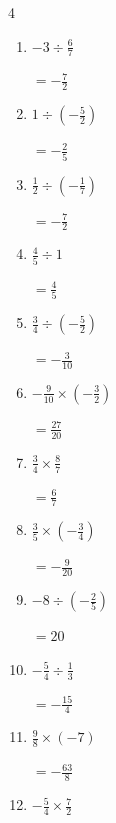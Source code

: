 \begin{multicols}{4}
\begin{enumerate}
        $\displaystyle =-\frac{12}{25}$

  \item $\displaystyle -3\div{}\frac{6}{7}$

        $\displaystyle =-\frac{7}{2}$

  \item $\displaystyle 1\div{}\left(-\frac{5}{2}\right)$

        $\displaystyle =-\frac{2}{5}$

  \item $\displaystyle \frac{1}{2}\div{}\left(-\frac{1}{7}\right)$

        $\displaystyle =-\frac{7}{2}$

\columnbreak %

  \item $\displaystyle \frac{4}{5}\div{}1$

        $\displaystyle =\frac{4}{5}$

  \item $\displaystyle \frac{3}{4}\div{}\left(-\frac{5}{2}\right)$

        $\displaystyle =-\frac{3}{10}$

  \item $\displaystyle -\frac{9}{10}\times{}\left(-\frac{3}{2}\right)$

        $\displaystyle =\frac{27}{20}$

  \item $\displaystyle \frac{3}{4}\times{}\frac{8}{7}$

        $\displaystyle =\frac{6}{7}$

  \item $\displaystyle \frac{3}{5}\times{}\left(-\frac{3}{4}\right)$

        $\displaystyle =-\frac{9}{20}$

  \item $\displaystyle -8\div{}\left(-\frac{2}{5}\right)$

        $\displaystyle =20$

  \item $\displaystyle -\frac{5}{4}\div{}\frac{1}{3}$

        $\displaystyle =-\frac{15}{4}$

  \item $\displaystyle \frac{9}{8}\times{}\left(-7\right)$

        $\displaystyle =-\frac{63}{8}$

  \item $\displaystyle -\frac{5}{4}\times{}\frac{7}{2}$


\end{enumerate}
\end{multicols}
